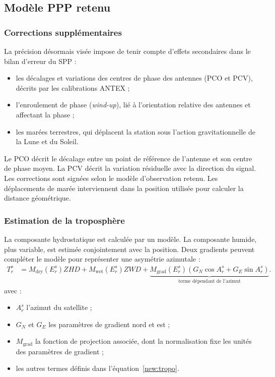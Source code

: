 \subsection{Modèle PPP retenu}

\subsubsection{Corrections supplémentaires}

La précision désormais visée impose de tenir compte d'effets secondaires
dans le bilan d'erreur du SPP :
\begin{itemize}
\item les décalages et variations des centres de phase des antennes (PCO et
PCV), décrits par les calibrations ANTEX ;
\item l'enroulement de phase (\textit{wind-up}), lié à l'orientation relative
des antennes et affectant la phase ;
\item les marées terrestres, qui déplacent la station sous l'action
gravitationnelle de la Lune et du Soleil.
\end{itemize}

Le PCO décrit le décalage entre un point de référence de l'antenne et son
centre de phase moyen. La PCV décrit la variation résiduelle avec la direction
du signal. Les corrections sont signées selon le modèle d'observation retenu.
Les déplacements de marée interviennent dans la position utilisée pour
calculer la distance géométrique.

\subsubsection{Estimation de la troposphère}

La composante hydrostatique est calculée par un modèle. La composante humide,
plus variable, est estimée conjointement avec la position. Deux gradients
peuvent compléter le modèle pour représenter une asymétrie azimutale :
\begin{align}
T_r^s&=M_{\mathrm{dry}}(E_r^s)ZHD+
M_{\mathrm{wet}}(E_r^s)ZWD
+\underbrace{M_{\mathrm{grad}}(E_r^s)
(G_N\cos A_r^s+G_E\sin A_r^s)}_{\text{terme dépendant de l'azimut}}.
\label{new:tropo_grad}
\end{align}
avec :
\begin{itemize}
\item $A_r^s$ l'azimut du satellite ;
\item $G_N$ et $G_E$ les paramètres de gradient nord et est ;
\item $M_{\mathrm{grad}}$ la fonction de projection associée, dont la
normalisation fixe les unités des paramètres de gradient ;
\item les autres termes définis dans l'équation~\eqref{new:tropo}.
\end{itemize}

